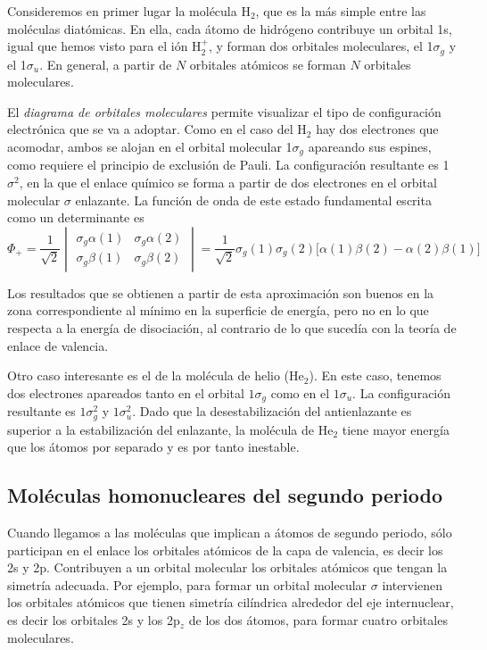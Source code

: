 \documentclass{tufte-handout}
\begin{document}
Consideremos en primer lugar la molécula H$_2$, que es la más
simple entre las moléculas diatómicas. 
En ella, cada átomo de hidrógeno contribuye un orbital 1s, igual que hemos visto para el ión H$_2^+$, y forman dos orbitales moleculares, el 1$\sigma_g$ y el 1$\sigma_u$. 
En general, a partir de $N$ orbitales atómicos se forman $N$ orbitales moleculares.

El \textit{diagrama de orbitales moleculares} permite visualizar el tipo de configuración electrónica que se va a adoptar. 
Como en el caso del H$_2$ hay dos electrones que acomodar, ambos se alojan en el orbital molecular 1$\sigma_g$ apareando sus espines, como requiere el principio de exclusión de Pauli. 
La configuración resultante es 1$\sigma^2$, en la que el enlace químico se forma a partir de dos electrones en el orbital molecular $\sigma$ enlazante. La función de onda de 
este estado fundamental escrita como un determinante es
\begin{equation}
   \Phi_+ =
   \frac{1}{\sqrt{2}}
   \begin{vmatrix}
\sigma_g\alpha(1) & \sigma_g\alpha(2) \\ 
\sigma_g\beta(1) & \sigma_g\beta(2) 
\end{vmatrix}=
\frac{1}{\sqrt{2}}\sigma_g(1)\sigma_g(2)\big[\alpha(1)\beta(2)-\alpha(2)\beta(1)\big]
\end{equation}

Los resultados que se obtienen a partir de esta aproximación 
son buenos en la zona correspondiente al mínimo en la superficie
de energía, pero no en lo que respecta a la energía de disociación, al contrario de lo que sucedía con la teoría de enlace de valencia.

Otro caso interesante es el de la molécula de helio (He$_2$). 
En este caso, tenemos dos electrones apareados tanto en
el orbital $1\sigma_g$ como en el $1\sigma_u$. 
La configuración resultante es $1\sigma_g^2$ y $1\sigma_u^2$. 
Dado que la desestabilización del antienlazante es superior a la
estabilización del enlazante, la molécula de He$_2$ 
tiene mayor energía que los átomos por separado y es por
tanto inestable.

\subsection{Moléculas homonucleares del segundo periodo}
Cuando llegamos a las moléculas que implican a átomos de segundo periodo, sólo participan en el enlace los orbitales atómicos de la capa de valencia, es decir los 2s y 2p.
Contribuyen a un orbital molecular los orbitales atómicos que tengan la simetría adecuada. Por ejemplo, para formar un orbital molecular $\sigma$ intervienen los orbitales atómicos que tienen simetría cilíndrica alrededor del eje internuclear, es decir los orbitales 2s y los 2p$_z$ de  los dos átomos, para formar cuatro orbitales moleculares.
\end{document}
